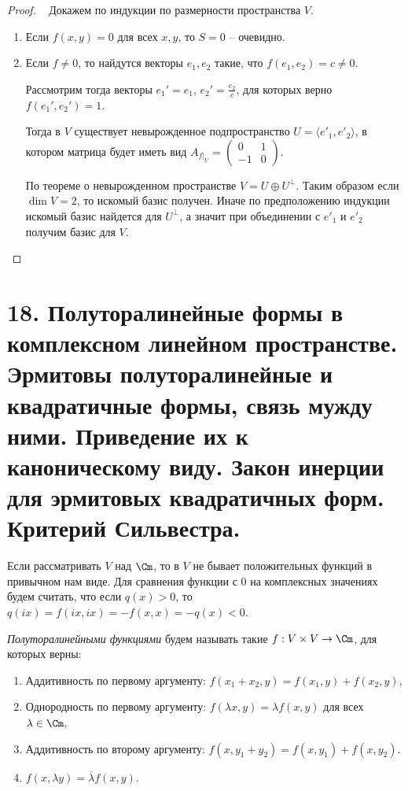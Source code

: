 \begin{proof}~
    Докажем по индукции по размерности пространства $V$. 
    \begin{enumerate}
        \item Если $f(x, y) = 0$ для всех $x, y$, то $S = 0$ -- очевидно.
        \item Если $f \neq 0$, то найдутся векторы $e_1, e_2$ такие, что $f(e_1, e_2) = c \neq 0$. 
        
        Рассмотрим тогда векторы $e_1' = e_1$, $e_2' = \frac{e_2}{c}$, для которых верно $f(e_1', e_2') = 1$.
        
        Тогда в $V$ существует невырожденное подпространство $U = \langle e'_1, e'_2 \rangle$,
        в котором матрица будет иметь вид $A_{f \vert_{U}} = \begin{pmatrix}
            0  &1 \\
            -1 &0
        \end{pmatrix}$.
        
        По теореме о невырожденном пространстве $V = U \oplus U^{\perp}$. Таким образом 
        если $\dim V = 2$, то искомый базис получен. Иначе по предположению
        индукции искомый базис найдется для $U^{\perp}$, а значит при объединении с $e'_1$ и $e'_2$ 
        получим базис для $V$.
    \end{enumerate}
\end{proof}

\section{18. Полуторалинейные формы в комплексном линейном пространстве. Эрмитовы полуторалинейные и квадратичные формы, связь мужду ними. Приведение их к каноническому виду. Закон инерции для эрмитовых квадратичных форм. Критерий Сильвестра.}

\begin{definition}
    Если рассматривать $V$ над $\Cm$, то в $V$ не бывает положительных функций в привычном нам виде.
    Для сравнения функции с $0$ на комплексных значениях будем считать, что если  $q(x) > 0$, то 
    $q(ix) = f(ix, ix) = -f(x,x) = -q(x) < 0$.
\end{definition}

\begin{definition}
    \textit{Полуторалинейными функциями} будем называть такие $f: V \times V \to \Cm$, для которых верны: 
    \begin{enumerate}
        \item Аддитивность по первому аргументу: $f(x_1 + x_2, y) = f(x_1, y) + f(x_2, y)$,
        \item Однородность по первому аргументу: $f(\lambda x, y) = \lambda f(x, y)$ для всех $\lambda \in \Cm$,
        \item Аддитивность по второму аргументу: $f(x, y_1 + y_2) = f(x, y_1) + f(x, y_2)$.
        \item $f(x, \lambda y) = \overline{\lambda} f(x, y)$.
    \end{enumerate}
\end{definition}

